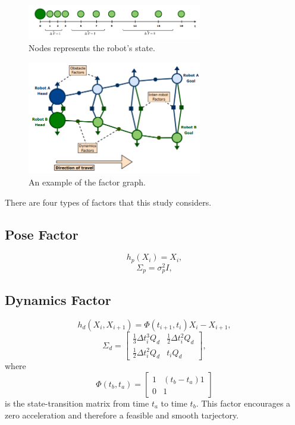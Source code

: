 \documentclass[twocolumn]{article}
\begin{document}
\begin{figure}[h]
    \centering
    \includegraphics[width=3in]{figures/robot_states.png}
    \caption{Nodes represents the robot's state.}
    \label{fig:robot_states}
\end{figure}
\begin{figure}[h]
    \centering
    \includegraphics[width=3in]{figures/factor_graph.png}
    \caption{An example of the factor graph.}
    \label{fig:factor_graph_example}
\end{figure}

There are four types of factors that this study considers. 

\subsection{Pose Factor}

\begin{equation}
    h_p(X_i) = X_i,
\end{equation}
\begin{equation}
    \Sigma_p = \sigma^2_pI,
\end{equation}

\subsection{Dynamics Factor}

\begin{equation}
    h_d(X_i, X_{i+1}) = \Phi(t_{i+1}, t_i)X_i - X_{i+1},
\end{equation}
\begin{equation}
    \Sigma_d = \begin{bmatrix}
        \frac{1}{3}\Delta t^3_iQ_d & \frac{1}{2}\Delta t^2_i Q_d \\
        \frac{1}{2}\Delta t^2_iQ_d & t_i Q_d
    \end{bmatrix},
\end{equation}
where
\begin{equation}
    \Phi(t_b, t_a) = \begin{bmatrix}
        1 & (t_b - t_a)1 \\
        0 & 1
    \end{bmatrix}
\end{equation}
is the state-transition matrix from time $t_a$ to time $t_b$. This factor encourages a zero acceleration and therefore a feasible and smooth tarjectory.
\end{document}
